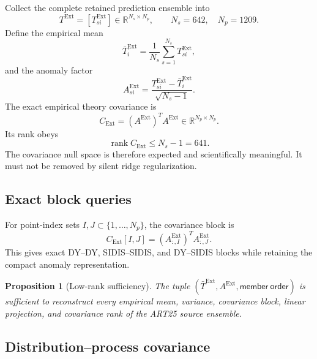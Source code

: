 \documentclass[11pt]{article}
\newtheorem{proposition}[definition]{Proposition}
\newcommand{\rank}{\operatorname{rank}}
\newcommand{\Ext}{\ensuremath{\mathrm{Ext}}}
\newcommand{\R}{\mathbb R}
\begin{document}
Collect the complete retained prediction ensemble into
\begin{equation}
 T^{\Ext}
 =
 \left[T_{si}^{\Ext}\right]
 \in\R^{N_s\times N_p},
 \qquad
 N_s=642,
 \quad
 N_p=1209.
 \label{eq:prediction-matrix}
\end{equation}
Define the empirical mean
\begin{equation}
 \bar T_i^{\Ext}
 =
 \frac{1}{N_s}
 \sum_{s=1}^{N_s}T_{si}^{\Ext},
 \label{eq:external-mean}
\end{equation}
and the anomaly factor
\begin{equation}
 A_{si}^{\Ext}
 =
 \frac{T_{si}^{\Ext}-\bar T_i^{\Ext}}
 {\sqrt{N_s-1}}.
 \label{eq:anomaly-factor}
\end{equation}
The exact empirical theory covariance is
\begin{equation}
 C_{\Ext}
 =
 \left(A^{\Ext}\right)^T A^{\Ext}
 \in\R^{N_p\times N_p}.
 \label{eq:external-covariance}
\end{equation}
Its rank obeys
\begin{equation}
 \rank C_{\Ext}\leq N_s-1=641.
 \label{eq:covariance-rank}
\end{equation}
The covariance null space is therefore expected and scientifically meaningful.  It must not be removed by silent ridge regularization.

\subsection{Exact block queries}

For point-index sets \(I,J\subset\{1,\ldots,N_p\}\), the covariance block is
\begin{equation}
 C_{\Ext}[I,J]
 =
 \left(A^{\Ext}_{:,I}\right)^T A^{\Ext}_{:,J}.
 \label{eq:block-query}
\end{equation}
This gives exact DY--DY, SIDIS--SIDIS, and DY--SIDIS blocks while retaining the compact anomaly representation.

\begin{proposition}[Low-rank sufficiency]
The tuple \((\bar T^{\Ext},A^{\Ext},\mathsf{member\ order})\) is sufficient to reconstruct every empirical mean, variance, covariance block, linear projection, and covariance rank of the ART25 source ensemble.
\end{proposition}

\subsection{Distribution--process covariance}
\end{document}
